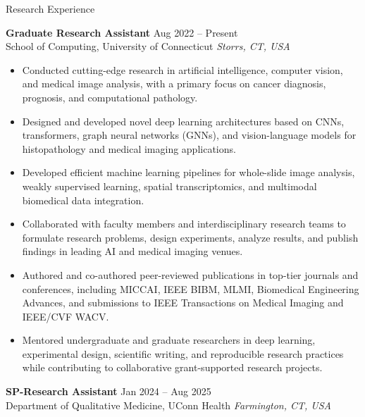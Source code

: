 \begin{rSection}{Research Experience}

\textbf{Graduate Research Assistant} \hfill {Aug 2022 -- Present}\\
School of Computing, University of Connecticut \hfill \textit{Storrs, CT, USA}

\begin{itemize}
    \itemsep -3pt {}
    \item Conducted cutting-edge research in artificial intelligence, computer vision, and medical image analysis, with a primary focus on cancer diagnosis, prognosis, and computational pathology.
    \item Designed and developed novel deep learning architectures based on CNNs, transformers, graph neural networks (GNNs), and vision-language models for histopathology and medical imaging applications.
    \item Developed efficient machine learning pipelines for whole-slide image analysis, weakly supervised learning, spatial transcriptomics, and multimodal biomedical data integration.
    \item Collaborated with faculty members and interdisciplinary research teams to formulate research problems, design experiments, analyze results, and publish findings in leading AI and medical imaging venues.
    \item Authored and co-authored peer-reviewed publications in top-tier journals and conferences, including MICCAI, IEEE BIBM, MLMI, Biomedical Engineering Advances, and submissions to IEEE Transactions on Medical Imaging and IEEE/CVF WACV.
    \item Mentored undergraduate and graduate researchers in deep learning, experimental design, scientific writing, and reproducible research practices while contributing to collaborative grant-supported research projects.
\end{itemize}

\textbf{SP-Research Assistant} \hfill {Jan 2024 -- Aug 2025}\\
Department of Qualitative Medicine, UConn Health \hfill \textit{Farmington, CT, USA}


\end{rSection}
